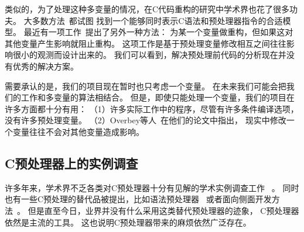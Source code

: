 类似的，为了处理这种多变量的情况，在C代码重构的研究中学术界也花了很多功夫。
大多数方法~\parencite{Garrido2002,Vittek2003,Spinellis2003,Garrido2013}都试图
找到一个能够同时表示C语法和预处理器指令的合适模型。
最近有一项工作~\parencite{Overbey2014}提出了另外一种方法：
为某一个变量做重构，但如果这对其他变量产生影响就阻止重构。
这项工作是基于预处理变量修改相互之间往往影响很小的观测而设计出来的。
我们可以看到，解决预处理前代码的分析现在并没有优秀的解决方案。

需要承认的是，我们的项目现在暂时也只考虑一个变量。
在未来我们可能会把我们的工作和多变量的算法相结合。
但是，即使只能处理一个变量，我们的项目在许多方面都十分有用：
（1）许多实际工作中的程序，尽管有许多条件编译选项，没有许多预处理变量。
（2）Overbey等人~\parencite{Overbey2014}在他们的论文中指出，
现实中修改一个变量往往不会对其他变量造成影响。




%
%

\subsection{C预处理器上的实例调查}
许多年来，学术界不乏各类对C预处理器十分有见解的学术实例调查工作
~\parencite{Spencer92,ernst2002empirical,Liebig2011}。
同时也有一些C预处理的替代品被提出，比如语法预处理器~\parencite{Weise1993,McCloskey:2005}
或者面向侧面开发方法~\parencite{Lohmann2006,Adams2009,Boucher2010}。
但是直至今日，业界并没有什么采用这类替代预处理器的迹象，
C预处理器依然是主流的工具。
这也说明C预处理器带来的麻烦依然广泛存在。



